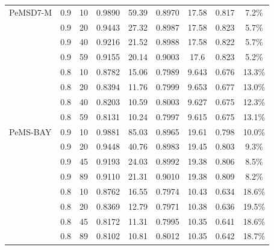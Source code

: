 \begin{table}[htbp]
\begin{tabular}{llrcccccc}
\midrule
PeMSD7-M & 0.9 & 10 & 0.9890 & 59.39 & 0.8970 & 17.58 & 0.817 & 7.2\% \\
 & 0.9 & 20 & 0.9443 & 27.32 & 0.8987 & 17.58 & 0.823 & 5.7\% \\
 & 0.9 & 40 & 0.9216 & 21.52 & 0.8988 & 17.58 & 0.822 & 5.7\% \\
 & 0.9 & 59 & 0.9155 & 20.14 & 0.9003 & 17.6 & 0.823 & 5.2\% \\
 & 0.8 & 10 & 0.8782 & 15.06 & 0.7989 & 9.643 & 0.676 & 13.3\% \\
 & 0.8 & 20 & 0.8394 & 11.76 & 0.7999 & 9.653 & 0.677 & 13.0\% \\
 & 0.8 & 40 & 0.8203 & 10.59 & 0.8003 & 9.627 & 0.675 & 12.3\% \\
 & 0.8 & 59 & 0.8131 & 10.24 & 0.7997 & 9.615 & 0.675 & 13.1\% \\
\midrule
PeMS-BAY & 0.9 & 10 & 0.9881 & 85.03 & 0.8965 & 19.61 & 0.798 & 10.0\% \\
 & 0.9 & 20 & 0.9448 & 40.76 & 0.8983 & 19.45 & 0.803 & 9.3\% \\
 & 0.9 & 45 & 0.9193 & 24.03 & 0.8992 & 19.38 & 0.806 & 8.5\% \\
 & 0.9 & 89 & 0.9110 & 21.31 & 0.9010 & 19.38 & 0.809 & 8.2\% \\
 & 0.8 & 10 & 0.8762 & 16.55 & 0.7974 & 10.43 & 0.634 & 18.6\% \\
 & 0.8 & 20 & 0.8369 & 12.79 & 0.7971 & 10.38 & 0.636 & 19.5\% \\
 & 0.8 & 45 & 0.8172 & 11.31 & 0.7995 & 10.35 & 0.641 & 18.6\% \\
 & 0.8 & 89 & 0.8102 & 10.81 & 0.8012 & 10.35 & 0.642 & 18.7\% \\
\bottomrule
\end{tabular}
\end{table}

